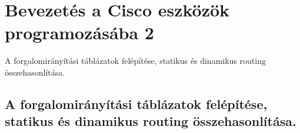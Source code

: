 \section{Bevezetés a Cisco eszközök programozásába 2}
{\footnotesize A forgalomirányítási táblázatok felépítése, statikus és dinamikus routing összehasonlítása.}
\subsection{A forgalomirányítási táblázatok felépítése, statikus és dinamikus routing összehasonlítása.}
